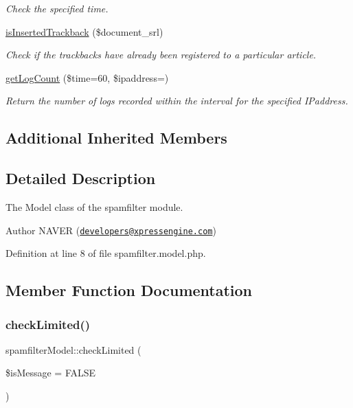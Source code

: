 \begin{DoxyCompactItemize}
\begin{DoxyCompactList}\small\item\em Check the specified time. \end{DoxyCompactList}\item 
\hyperlink{classspamfilterModel_a6b92cb33d6204158cff0baca2d9f3f4b}{is\+Inserted\+Trackback} (\$document\+\_\+srl)
\begin{DoxyCompactList}\small\item\em Check if the trackbacks have already been registered to a particular article. \end{DoxyCompactList}\item 
\hyperlink{classspamfilterModel_a3f46333476c1f3e3feba759dca738288}{get\+Log\+Count} (\$time=60, \$ipaddress=\textquotesingle{}\textquotesingle{})
\begin{DoxyCompactList}\small\item\em Return the number of logs recorded within the interval for the specified I\+Paddress. \end{DoxyCompactList}\end{DoxyCompactItemize}
\subsection*{Additional Inherited Members}


\subsection{Detailed Description}
The Model class of the spamfilter module. 

\begin{DoxyAuthor}{Author}
N\+A\+V\+ER (\href{mailto:developers@xpressengine.com}{\tt developers@xpressengine.\+com}) 
\end{DoxyAuthor}


Definition at line 8 of file spamfilter.\+model.\+php.



\subsection{Member Function Documentation}
\hypertarget{classspamfilterModel_af681d9fd66de2c4769ebe3880983c689}{}\label{classspamfilterModel_af681d9fd66de2c4769ebe3880983c689} 
\subsubsection{\texorpdfstring{check\+Limited()}{checkLimited()}}
{\footnotesize\ttfamily spamfilter\+Model\+::check\+Limited (\begin{DoxyParamCaption}\item[{}]{\$is\+Message = {\ttfamily FALSE} }\end{DoxyParamCaption})}



